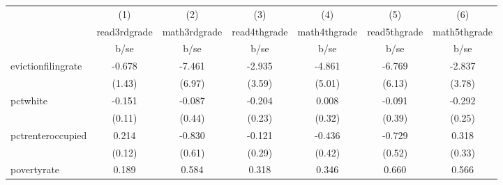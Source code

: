 {
\def\sym#1{\ifmmode^{#1}\else\(^{#1}\)\fi}
\begin{tabular}{l*{6}{c}}
\hline\hline
            &\multicolumn{1}{c}{(1)}           &\multicolumn{1}{c}{(2)}           &\multicolumn{1}{c}{(3)}           &\multicolumn{1}{c}{(4)}           &\multicolumn{1}{c}{(5)}           &\multicolumn{1}{c}{(6)}           \\
            &\multicolumn{1}{c}{read3rdgrade}  &\multicolumn{1}{c}{math3rdgrade}  &\multicolumn{1}{c}{read4thgrade}  &\multicolumn{1}{c}{math4thgrade}  &\multicolumn{1}{c}{read5thgrade}  &\multicolumn{1}{c}{math5thgrade}  \\
            &                     b/se         &                     b/se         &                     b/se         &                     b/se         &                     b/se         &                     b/se         \\
\hline
evictionfilingrate&                   -0.678         &                   -7.461         &                   -2.935         &                   -4.861         &                   -6.769         &                   -2.837         \\
            &                   (1.43)         &                   (6.97)         &                   (3.59)         &                   (5.01)         &                   (6.13)         &                   (3.78)         \\
pctwhite    &                   -0.151         &                   -0.087         &                   -0.204         &                    0.008         &                   -0.091         &                   -0.292         \\
            &                   (0.11)         &                   (0.44)         &                   (0.23)         &                   (0.32)         &                   (0.39)         &                   (0.25)         \\
pctrenteroccupied&                    0.214         &                   -0.830         &                   -0.121         &                   -0.436         &                   -0.729         &                    0.318         \\
            &                   (0.12)         &                   (0.61)         &                   (0.29)         &                   (0.42)         &                   (0.52)         &                   (0.33)         \\
povertyrate &                    0.189         &                    0.584         &                    0.318         &                    0.346         &                    0.660         &                    0.566         \\

\end{tabular}}
